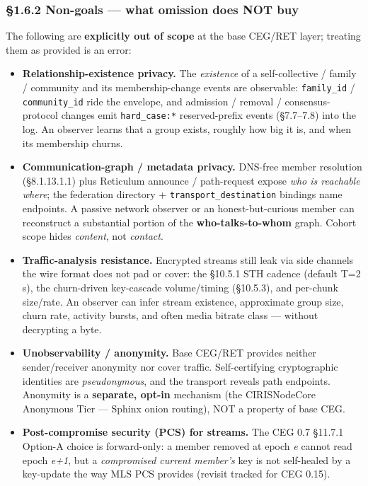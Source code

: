 \documentclass[11pt]{article}
\begin{document}
\subsubsection*{§1.6.2 Non-goals — what omission does NOT buy}

The following are \textbf{explicitly out of scope} at the base CEG/RET layer; treating them as provided is an error:


\begin{itemize}\setlength\itemsep{0pt}
\item \textbf{Relationship-existence privacy.} The \textit{existence} of a self-collective / family / community and its membership-change events are observable: \texttt{family\_id} / \texttt{community\_id} ride the envelope, and admission / removal / consensus-protocol changes emit \texttt{hard\_case:*} reserved-prefix events (§7.7–7.8) into the log. An observer learns that a group exists, roughly how big it is, and when its membership churns.
\item \textbf{Communication-graph / metadata privacy.} DNS-free member resolution (§8.1.13.1.1) plus Reticulum announce / path-request expose \textit{who is reachable where}; the federation directory + \texttt{transport\_destination} bindings name endpoints. A passive network observer or an honest-but-curious member can reconstruct a substantial portion of the \textbf{who-talks-to-whom} graph. Cohort scope hides \textit{content}, not \textit{contact}.
\item \textbf{Traffic-analysis resistance.} Encrypted streams still leak via side channels the wire format does not pad or cover: the §10.5.1 STH cadence (default T=2 s), the churn-driven key-cascade volume/timing (§10.5.3), and per-chunk size/rate. An observer can infer stream existence, approximate group size, churn rate, activity bursts, and often media bitrate class — without decrypting a byte.
\item \textbf{Unobservability / anonymity.} Base CEG/RET provides neither sender/receiver anonymity nor cover traffic. Self-certifying cryptographic identities are \textit{pseudonymous}, and the transport reveals path endpoints. Anonymity is a \textbf{separate, opt-in} mechanism (the CIRISNodeCore Anonymous Tier — Sphinx onion routing), NOT a property of base CEG.
\item \textbf{Post-compromise security (PCS) for streams.} The CEG 0.7 §11.7.1 Option-A choice is forward-only: a member removed at epoch \textit{e} cannot read epoch \textit{e+1}, but a \textit{compromised current member's} key is not self-healed by a key-update the way MLS PCS provides (revisit tracked for CEG 0.15).
\end{itemize}
\end{document}
